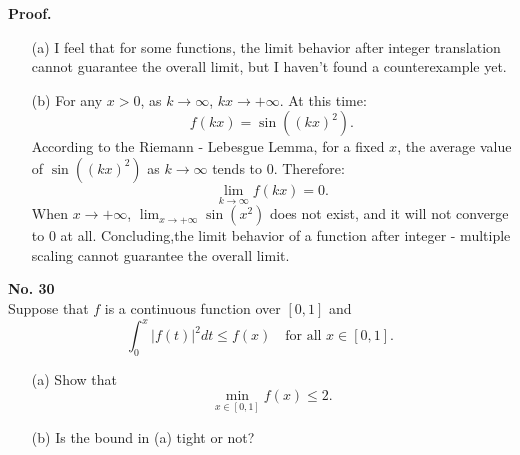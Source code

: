 \documentclass[a4paper, 11pt]{article}
\newenvironment{problem}[2][No.]
    { \begin{mdframed}[backgroundcolor=gray!5] \textbf{#1 #2} \\}
    {  \end{mdframed}}
\newenvironment{solution}
    {\textbf{Proof.}}
    {}
\begin{document}
\begin{solution}
		\begin{enumerate}
		\item[(a)]I feel that for some functions, the limit behavior after integer translation cannot guarantee the overall limit, but I haven't found a counterexample yet.
		\item[(b)] For any \( x > 0 \), as \( k \to \infty \), \( kx \to +\infty \). At this time:
$$
f(kx) = \sin((kx)^2). 
$$
 According to the Riemann - Lebesgue Lemma, for a fixed \( x \), the average value of \( \sin((kx)^2) \) as \( k \to \infty \) tends to \( 0 \). Therefore:
		$$
		\lim_{k \to \infty} f(kx) = 0. 
		$$
When \( x \to +\infty \),  \( \lim_{x \to +\infty} \sin(x^2) \) does not exist, and it will not converge to \( 0 \) at all.
Concluding,the limit behavior of a function after integer - multiple scaling  cannot guarantee the overall limit.
				\end{enumerate}
		
\end{solution}
\begin{problem}{30}
	Suppose that \( f \) is a continuous function over \([0, 1]\) and
	$$
	\int_0^x |f(t)|^2 dt \leq f(x) \quad \text{for all } x \in [0, 1].
	$$
	\begin{enumerate}
		\item[(a)] Show that
	$$
	\min_{x \in [0, 1]} f(x) \leq 2.
	$$
\item[(b)] Is the bound in (a) tight or not?
	\end{enumerate}
\end{problem}
\end{document}

